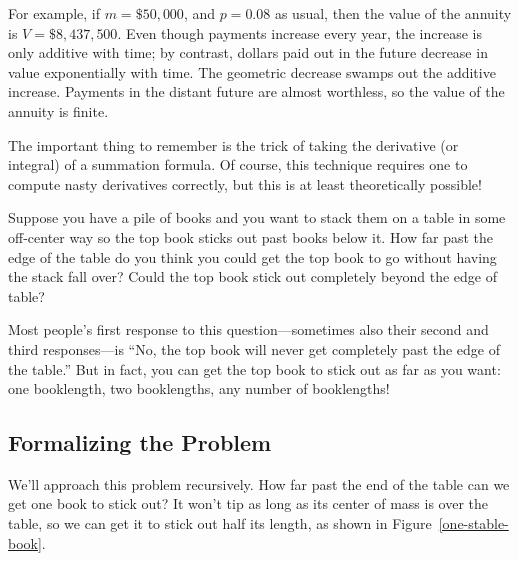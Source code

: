 \begin{staffnotes}
For example, if $m = \$50,000$, and $p = 0.08$ as usual, then the
value of the annuity is $V = \$8,437,500$.  Even though payments
increase every year, the increase is only additive with time; by
contrast, dollars paid out in the future decrease in value
exponentially with time.  The geometric decrease swamps out the
additive increase.  Payments in the distant future are almost
worthless, so the value of the annuity is finite.

The important thing to remember is the trick of taking the derivative
(or integral) of a summation formula.  Of course, this technique
requires one to compute nasty derivatives correctly, but this is at
least theoretically possible!

\end{staffnotes}

\begin{problems}

\classproblems
{}

\homeworkproblems
{}

\end{problems}

\label{book_stacking_sec}

Suppose you have a pile of books and you want to stack them on a table in
some off-center way so the top book sticks out past books below it.  How
far past the edge of the table do you think you could get the top book to
go without having the stack fall over?  Could the top book stick out
completely beyond the edge of table?

Most people's first response to this question---sometimes also their
second and third responses---is ``No, the top book will never get
completely past the edge of the table.''  But in fact, you can get the top
book to stick out as far as you want: one booklength, two booklengths, any
number of booklengths!

\subsection{Formalizing the Problem}

We'll approach this problem recursively.  How far past the end of the
table can we get one book to stick out?  It won't tip as long as its
center of mass is over the table, so we can get it to stick out half its
length, as shown in Figure~\ref{one-stable-book}.

